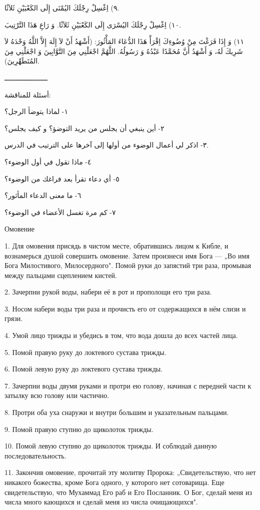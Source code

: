 \documentclass[a5paper]{article}
\begin{document}
٩) اِغْسِلْ رِجْلَكَ اليُمْنَى إِلَى الكَعْبَيْنِ ثَلاَثًا.

١٠) اِغْسِلْ رِجْلَكَ اليُسْرَى إِلَى الكَعْبَيْنِ ثَلاَثًا. وَ رَاعِ هَذَا التَّرْتِيبَ.

١١) وَ إِذَا فَرَغْتَ مِنْ وُضُوءِكَ اِقْرَأْ هَذَا الدُّعَاءَ المَأْثُورَ: (أَشْهَدُ أَنْ لاَ إِلَهَ إِلاَّ اللَّهُ وَحْدَهُ لاَ شَرِيكَ لَهُ، وَ أَشْهَدُ أَنَّ مُحَمَّدًا عَبْدُهُ وَ رَسُولُهُ. اللَّهُمَّ اجْعَلْنِي مِنَ التَّوَّابِينَ وَ اجْعَلْنِي مِنَ المُتَطَهِّرِينَ).

ـــــــــــــــــــــ

أسئلة للمناقشة:

١- لماذا يتوضأ الرجل؟

٢- أين ينبغي أن يجلس من يريد التوضؤ؟ و كيف يجلس؟

٣- اذكر لي أعمال الوضوء من أولها إلى آخرها على الترتيب في الدرس.

٤- ماذا تقول في أول الوضوء؟

٥- أي دعاء تقرأ بعد فراغك من الوضوء؟

٦- ما معنى الدعاء المأثور؟

٧- كم مرة تغسل الأعضاء في الوضوء؟

Омовение

1. Для омовения присядь в чистом месте, обратившись лицом к Кибле, и вознамерься душой совершить омовение. Затем произнеси имя Бога — „Во имя Бога Милостивого, Милосердного". Помой руки до запястий три раза, промывая между пальцами сцеплением кистей.

2. Зачерпни рукой воды, набери её в рот и прополощи его три раза.

3. Носом набери воды три раза и прочисть его от содержащихся в нём слизи и грязи.

4. Умой лицо трижды и убедись в том, что вода дошла до всех частей лица.

5. Помой правую руку до локтевого сустава трижды.

6. Помой левую руку до локтевого сустава трижды.

7. Зачерпни воды двумя руками и протри ею голову, начиная с передней части к затылку всю голову или частично.

8. Протри оба уха снаружи и внутри большим и указательным пальцами.

9. Помой правую ступню до щиколоток трижды.

10. Помой левую ступню до щиколоток трижды. И соблюдай данную последовательность.

11. Закончив омовение, прочитай эту молитву Пророка: „Свиде­тельствую, что нет никакого божества, кроме Бога одного, у которого нет сотоварища. Еще свидетельствую, что Мухаммад Его раб и Его Посланник. О Бог, сделай меня из числа много кающихся и сделай меня из числа очищающихся".
\end{document}
